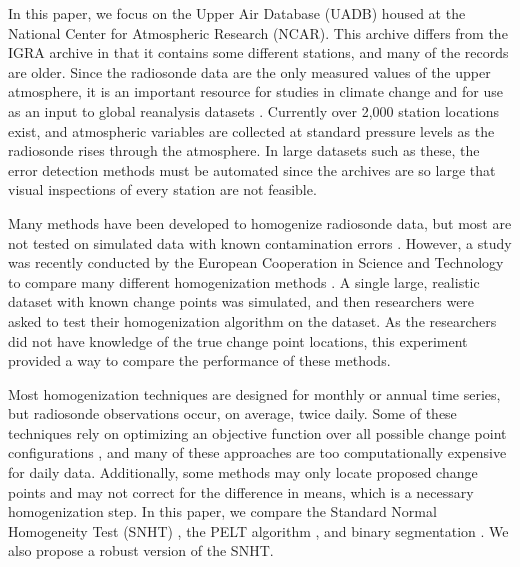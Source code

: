 \documentclass[12pt]{article}
\begin{document}
\begin{doublespacing}
In this paper, we  focus on the Upper Air Database (UADB) housed at the National Center for Atmospheric Research (NCAR). This archive differs from the IGRA archive in that it contains some different stations, and many of the records are older. Since the radiosonde data are the only measured values of the upper atmosphere, it is an important resource for studies in climate change \cite{elliott91, eskridge95} and for use as an input to global reanalysis datasets \cite{kalnay96, kanamitsu02}. Currently over 2,000 station locations exist, and atmospheric variables are collected at standard pressure levels as the radiosonde rises through the atmosphere. In large datasets such as these, the error detection methods must be automated since the archives are so large that visual inspections of every station are not feasible.

Many methods have been developed to homogenize radiosonde data, but most are not tested on simulated data with known contamination errors \cite{eskridge95, haimberger07, lanzante96, lanzante03, venema12}.  However, a study was recently conducted by the European Cooperation in Science and Technology to compare many different homogenization methods \cite{venema12}.  A single large, realistic dataset with known change points was simulated, and then researchers were asked to test their homogenization algorithm on the dataset.  As the researchers did not have knowledge of the true change point locations, this experiment provided a way to compare the performance of  these  methods.  

Most homogenization techniques are designed for monthly or annual time series, but radiosonde observations occur, on average, twice daily.  Some of these techniques rely on optimizing an objective function over all possible change point configurations \cite{killick12, li14, lu10, scott74}, and many of these approaches are too computationally expensive for daily data.  Additionally, some methods may only locate proposed change points and may not correct for the difference in means, which is a necessary homogenization step.  In this paper, we compare the Standard Normal Homogeneity Test (SNHT) \cite{alexandersson86}, the PELT algorithm \cite{killick12}, and binary segmentation \cite{scott74}.  We also propose a robust version of the SNHT.


\end{doublespacing}
\end{document}
